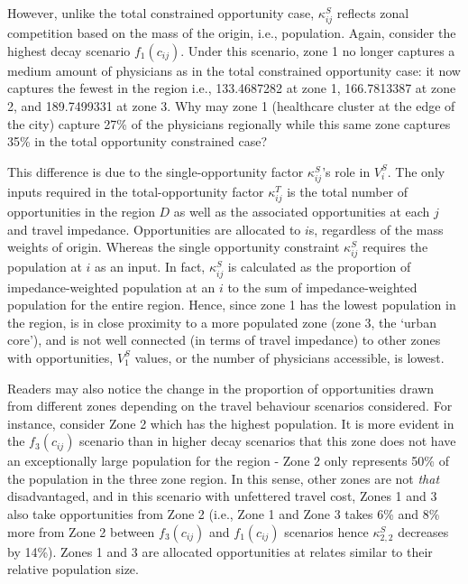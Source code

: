 \documentclass[
]{article}
\begin{document}
However, unlike the total constrained opportunity case,
\(\kappa^S_{ij}\) reflects zonal competition based on the mass of the
origin, i.e., population. Again, consider the highest decay scenario
\(f_1(c_{ij})\). Under this scenario, zone 1 no longer captures a medium
amount of physicians as in the total constrained opportunity case: it
now captures the fewest in the region i.e., 133.4687282 at zone 1,
166.7813387 at zone 2, and 189.7499331 at zone 3. Why may zone 1
(healthcare cluster at the edge of the city) capture 27\% of the
physicians regionally while this same zone captures 35\% in the total
opportunity constrained case?

This difference is due to the single-opportunity factor
\(\kappa^S_{ij}\)'s role in \(V_i^S\). The only inputs required in the
total-opportunity factor \(\kappa^T_{ij}\) is the total number of
opportunities in the region \(D\) as well as the associated
opportunities at each \(j\) and travel impedance. Opportunities are
allocated to \(i\)s, regardless of the mass weights of origin. Whereas
the single opportunity constraint \(\kappa^S_{ij}\) requires the
population at \(i\) as an input. In fact, \(\kappa^S_{ij}\) is
calculated as the proportion of impedance-weighted population at an
\(i\) to the sum of impedance-weighted population for the entire region.
Hence, since zone 1 has the lowest population in the region, is in close
proximity to a more populated zone (zone 3, the `urban core'), and is
not well connected (in terms of travel impedance) to other zones with
opportunities, \(V_{1}^S\) values, or the number of physicians
accessible, is lowest.

Readers may also notice the change in the proportion of opportunities
drawn from different zones depending on the travel behaviour scenarios
considered. For instance, consider Zone 2 which has the highest
population. It is more evident in the \(f_3(c_{ij})\) scenario than in
higher decay scenarios that this zone does not have an exceptionally
large population for the region - Zone 2 only represents 50\% of the
population in the three zone region. In this sense, other zones are not
\emph{that} disadvantaged, and in this scenario with unfettered travel
cost, Zones 1 and 3 also take opportunities from Zone 2 (i.e., Zone 1
and Zone 3 takes 6\% and 8\% more from Zone 2 between \(f_3(c_{ij})\)
and \(f_1(c_{ij})\) scenarios hence \(\kappa_{2,2}^S\) decreases by
14\%). Zones 1 and 3 are allocated opportunities at relates similar to
their relative population size.
\end{document}
